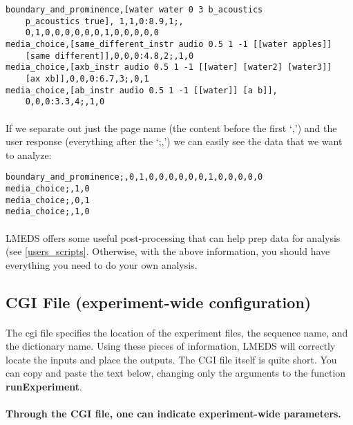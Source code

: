 \begin{lstlisting}
boundary_and_prominence,[water water 0 3 b_acoustics
	p_acoustics true], 1,1,0:8.9,1;,
	0,1,0,0,0,0,0,0,1,0,0,0,0,0
media_choice,[same_different_instr audio 0.5 1 -1 [[water apples]]
	[same different]],0,0,0:4.8,2;,1,0
media_choice,[axb_instr audio 0.5 1 -1 [[water] [water2] [water3]]
	[ax xb]],0,0,0:6.7,3;,0,1
media_choice,[ab_instr audio 0.5 1 -1 [[water]] [a b]],
	0,0,0:3.3,4;,1,0
\end{lstlisting}

\paragraph{}
If we separate out just the page name (the content before the first `,') and the user response (everything after the `;,') we can easily see the data that we want to analyze: 

\begin{lstlisting}
boundary_and_prominence;,0,1,0,0,0,0,0,0,1,0,0,0,0,0
media_choice;,1,0
media_choice;,0,1
media_choice;,1,0
\end{lstlisting}

\paragraph{}
LMEDS offers some useful post-processing that can help prep data for analysis (see \ref{users_scripts}.  Otherwise, with the above information, you should have everything you need to do your own analysis.

\subsection{CGI File (experiment-wide configuration)}
\label{sec:cgitemplate}

\paragraph{}
The cgi file  specifies the location of the experiment files, the sequence name, and the dictionary name.  Using these pieces of information, LMEDS will correctly locate the inputs and place the outputs.  The CGI file itself is quite short.  You can copy and paste the text below, changing only the arguments to the function \textbf{runExperiment}.

\paragraph{}
\textbf{Through the CGI file, one can indicate experiment-wide parameters.}

